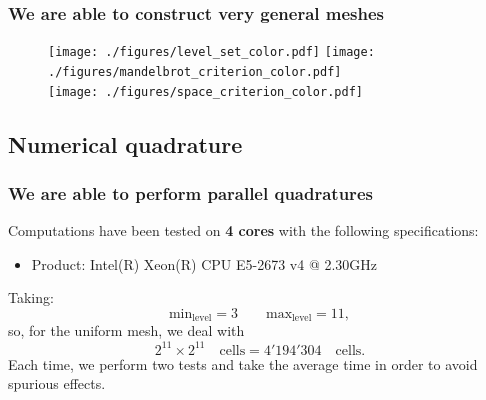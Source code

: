 \documentclass[8pt]{beamer}
\begin{document}
\begin{frame}
\frametitle{We are able to construct very general meshes}\pause
 \begin{figure}[!h]
\begin{center}
\texttt{[image: ./figures/level\_set\_color.pdf]}
\texttt{[image: ./figures/mandelbrot\_criterion\_color.pdf]} \\
\texttt{[image: ./figures/space\_criterion\_color.pdf]}
\end{center}
\end{figure}
\end{frame}

\subsection{Numerical quadrature}

\begin{frame}
\frametitle{We are able to perform parallel quadratures}
\pause
Computations have been tested on \textbf{4 cores} with the following specifications:
\begin{itemize}
 \item Product: Intel(R) Xeon(R) CPU E5-2673 v4 @ 2.30GHz
\end{itemize}
Taking:
\begin{equation*}
 \text{min}_{\text{level}} = 3 \qquad \text{max}_{\text{level}} = 11,
\end{equation*}
so, for the uniform mesh, we deal with
\begin{equation*}
 2^{11} \times 2^{11} \quad \text{cells} = 4'194'304 \quad \text{cells}.
\end{equation*}
Each time, we perform two tests and take the average time in order to avoid spurious effects.
\end{frame}
\end{document}
